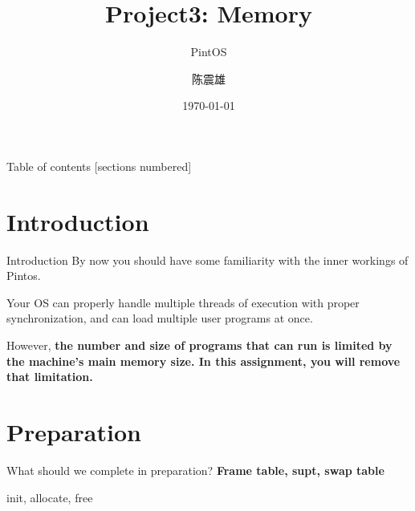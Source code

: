 \documentclass[10pt]{beamer}
\title{Project3: Memory	}
\subtitle{PintOS}
\date{\today}
\author{陈震雄}
\institute{武汉大学}
\begin{document}
\maketitle

\begin{frame}{Table of contents}
  [sections numbered]
  \tableofcontents[hideallsubsections]
\end{frame}

\section{Introduction}

\begin{frame}[fragile]{Introduction}
    By now you should have some familiarity with the inner workings of Pintos.

Your OS can properly handle multiple threads of execution with proper synchronization, and can load multiple user programs at once.

However, \textbf{the number and size of programs that can run is limited by the machine's main memory size. In this assignment, you will remove that limitation.}
\end{frame}
\section{Preparation}
\begin{frame}[fragile]{What should we complete in preparation?}
    \textbf{Frame table, supt, swap table}
    
    init, allocate, free
\end{frame}
\end{document}
